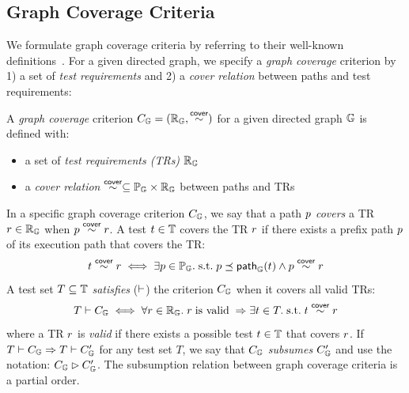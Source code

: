 \subsection{Graph Coverage Criteria}\label{sec:cov}

We formulate graph coverage criteria by referring to their well-known
definitions~\cite{cov-def}.
%
For a given directed graph, we specify a \textit{graph coverage} criterion by 1)
a set of \textit{test requirements} and 2) a \textit{cover relation} between
paths and test requirements:


\begin{definition}\label{def:graph-cov}
  A \textit{graph coverage} criterion $C_{\mathbb{G}} = (\mathbb{R}_{\mathbb{G}}, \overset{\textsf{cover}}{\sim})$
  for a given directed graph $\mathbb{G}$ is defined with:
  \begin{itemize}
    \item a set of \textit{test requirements (TRs)} $\mathbb{R}_{\mathbb{G}}$
    \item a \textit{cover relation} $\overset{\textsf{cover}}{\sim} \subseteq \mathbb{P}_{\mathbb{G}} \times
      \mathbb{R}_{\mathbb{G}}$ between paths and TRs
  \end{itemize}
\end{definition}


In a specific graph coverage criterion $C_{\mathbb{G}}$, we say that a path $p$
\textit{covers} a TR $r \in \mathbb{R}_{\mathbb{G}}$ when $p \overset{\textsf{cover}}{\sim}
r$.
A test $t \in \mathbb{T}$ covers the TR $r$ if there exists
a prefix path $p$ of its execution path that covers the TR:
%
\begin{equation}\label{equ:test-cover}
  t \overset{\textsf{cover}}{\sim} r
  \iff
  \exists p \in \mathbb{P}_{\mathbb{G}}. {\; \text{s.t.} \; }
  p \preceq \textsf{path}_{\mathbb{G}}(t) \wedge
  p \overset{\textsf{cover}}{\sim} r
\end{equation}
%
A test set $T \subseteq \mathbb{T}$ \textit{satisfies} ($\vdash$) the criterion
$C_{\mathbb{G}}$ when it covers all valid TRs:
\begin{equation}\label{equ:sat}
  T \vdash C_{\mathbb{G}}
  \iff
  \forall r \in \mathbb{R}_{\mathbb{G}}. \;
  r \; \text{is valid} \; \Rightarrow
  \exists t \in T. {\; \text{s.t.} \; } t \overset{\textsf{cover}}{\sim} r
\end{equation}
where a TR $r$ is \textit{valid} if there exists a possible test $t \in
\mathbb{T}$ that covers $r$.
%
If $T \vdash C_{\mathbb{G}} \Rightarrow T \vdash C_{\mathbb{G}}'$ for any test set $T$,
we say that $C_{\mathbb{G}}$ \textit{subsumes} $C_{\mathbb{G}}'$ and use the
notation: $C_{\mathbb{G}} \rhd C_{\mathbb{G}}'$.
%
The subsumption relation between graph coverage criteria is a partial order.

